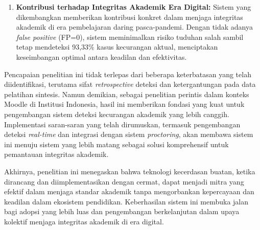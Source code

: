 \begin{enumerate}
    \item \textbf{Kontribusi terhadap Integritas Akademik Era Digital:} Sistem yang dikembangkan memberikan kontribusi konkret dalam menjaga integritas akademik di era pembelajaran daring pasca-pandemi. Dengan tidak adanya \textit{false positive} (FP=0), sistem meminimalkan risiko tuduhan salah sambil tetap mendeteksi 93,33\% kasus kecurangan aktual, menciptakan keseimbangan optimal antara keadilan dan efektivitas.
\end{enumerate}

Pencapaian penelitian ini tidak terlepas dari beberapa keterbatasan yang telah diidentifikasi, terutama sifat \textit{retrospective} deteksi dan ketergantungan pada data pelatihan sintesis. Namun demikian, sebagai penelitian perintis dalam konteks Moodle di Institusi Indonesia, hasil ini memberikan fondasi yang kuat untuk pengembangan sistem deteksi kecurangan akademik yang lebih canggih. Implementasi saran-saran yang telah dirumuskan, termasuk pengembangan deteksi \textit{real-time} dan integrasi dengan sistem \textit{proctoring}, akan membawa sistem ini menuju sistem yang lebih matang sebagai solusi komprehensif untuk pemantauan integritas akademik.

Akhirnya, penelitian ini menegaskan bahwa teknologi kecerdasan buatan, ketika dirancang dan diimplementasikan dengan cermat, dapat menjadi mitra yang efektif dalam menjaga standar akademik tanpa mengorbankan kepercayaan dan keadilan dalam ekosistem pendidikan. Keberhasilan sistem ini membuka jalan bagi adopsi yang lebih luas dan pengembangan berkelanjutan dalam upaya kolektif menjaga integritas akademik di era digital. 